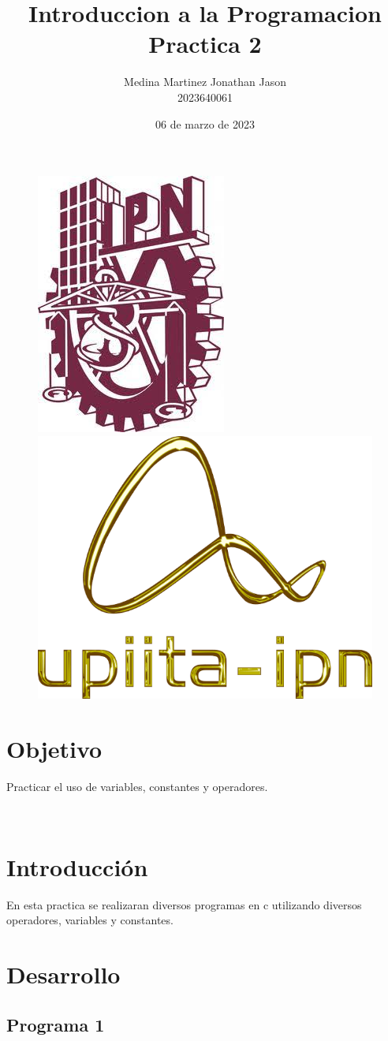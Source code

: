 \documentclass{article}
\title{Introduccion a la Programacion \\ Practica 2}
\author{Medina Martinez Jonathan Jason \\ 2023640061}
\date{06 de marzo de 2023}
\begin{document}

\fontsize{12}{16}\selectfont

\begin{figure}[t] %

\includegraphics[width=2.5 cm]{Logo1.jpeg}
\hfill
\includegraphics[width=3 cm]{Logo2.png}

\end{figure}

\maketitle %
\newpage

\tableofcontents %
\newpage

\section{Objetivo}

Practicar el uso de variables, constantes y operadores.

\
\
\

\section{Introducción}

En esta practica se realizaran diversos programas en c utilizando diversos operadores, variables y constantes.

\newpage

\section{Desarrollo}
\subsection{Programa 1}
\end{document}
